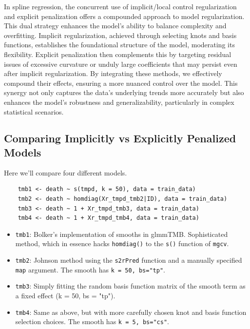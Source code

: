 \documentclass[12pt, twoside,hidelinks]{article}
\theoremstyle{definition}
\numberwithin{equation}{section}
\begin{document}
In spline regression, the concurrent use of implicit/local control regularization and explicit penalization offers a compounded approach to model regularization. This dual strategy enhances the model's ability to balance complexity and overfitting. Implicit regularization, achieved through selecting knots and basis functions, establishes the foundational structure of the model, moderating its flexibility. Explicit penalization then complements this by targeting residual issues of excessive curvature or unduly large coefficients that may persist even after implicit regularization. By integrating these methods, we effectively compound their effects, ensuring a more nuanced control over the model. This synergy not only captures the data's underlying trends more accurately but also enhances the model's robustness and generalizability, particularly in complex statistical scenarios.

\subsection{Comparing Implicitly vs Explicitly Penalized Models}

Here we'll compare four different models. 

\begin{verbatim}
    tmb1 <- death ~ s(tmpd, k = 50), data = train_data)
    tmb2 <- death ~ homdiag(Xr_tmpd_tmb2|ID), data = train_data)
    tmb3 <- death ~ 1 + Xr_tmpd_tmb3, data = train_data)
    tmb4 <- death ~ 1 + Xr_tmpd_tmb4, data = train_data)
\end{verbatim}

\begin{itemize}
    \setlength{\itemsep}{1em} %
    \item \texttt{tmb1}: Bolker's implementation of smooths in glmmTMB. Sophisticated method, which in essence hacks \texttt{homdiag()} to the \texttt{s()} function of \texttt{mgcv}.
    \item \texttt{tmb2}: Johnson method using the \texttt{s2rPred} function and a manually specified \texttt{map} argument. The smooth has \texttt{k = 50, bs="tp"}.
    \item \texttt{tmb3}: Simply fitting the random basis function matrix of the smooth term as a fixed effect (k = 50, bs = "tp").
    \item \texttt{tmb4}: Same as above, but with more carefully chosen knot and basis function selection choices. The smooth has \texttt{k = 5, bs="cs"}.  
\end{itemize}
\end{document}
